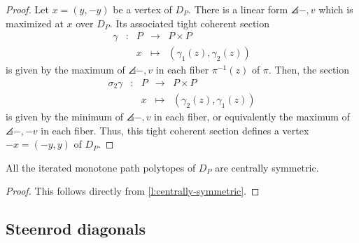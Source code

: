 \begin{proof}
	Let $x = (y,-y)$ be a vertex of $D_P$.
	There is a linear form $\angles{-,v}$ which is maximized at $x$ over $D_P$.
	Its associated tight coherent section
	\begin{equation*}
		\begin{matrix}
			\gamma & : & P & \to & P \times P \\
			& & x & \mapsto & (\gamma_1(z),\gamma_2(z))
		\end{matrix}
	\end{equation*}
	is given by the maximum of $\angles{-,v}$ in each fiber $\pi^{-1}(z)$ of $\pi$.
	Then, the section
	\begin{equation*}
		\begin{matrix}
			\sigma_2\gamma & : & P & \to & P \times P \\
			& & x & \mapsto & (\gamma_2(z),\gamma_1(z))
		\end{matrix}
	\end{equation*}
	is given by the minimum of $\angles{-,v}$ in each fiber, or equivalently the maximum of $\angles{-,-v}$ in each fiber.
	Thus, this tight coherent section defines a vertex $-x=(-y,y)$ of $D_P$.
\end{proof}


\begin{corollary}
	All the iterated monotone path polytopes of $D_P$ are centrally symmetric.
\end{corollary}

\begin{proof}
	This follows directly from \cref{l:centrally-symmetric}.
\end{proof}

\subsection{Steenrod diagonals}

%


